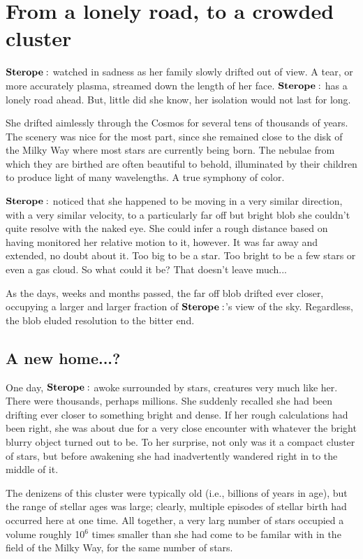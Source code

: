 \section{From a lonely road, to a crowded cluster}

$\Sterope$ watched in sadness as her family slowly drifted out of view.  A tear, or more accurately plasma, streamed down the length of her face.  $\Sterope$ has a lonely road ahead.  But, little did she know, her isolation would not last for long.

She drifted aimlessly through the Cosmos for several tens of thousands of years.  The scenery was nice for the most part, since she remained close to the disk of the Milky Way where most stars are currently being born.  The nebulae from which they are birthed are often beautiful to behold, illuminated by their children to produce light of many wavelengths.  A true symphony of color.  

$\Sterope$ noticed that she happened to be moving in a very similar direction, with a very similar velocity, to a particularly far off but bright blob she couldn't quite resolve with the naked eye.  She could infer a rough distance based on having monitored her relative motion to it, however.  It was far away and extended, no doubt about it.  Too big to be a star.  Too bright to be a few stars or even a gas cloud.  So what could it be?  That doesn't leave much...

As the days, weeks and months passed, the far off blob drifted ever closer, occupying a larger and larger fraction of $\Sterope$'s view of the sky.  Regardless, the blob eluded resolution to the bitter end.

\subsection{A new home...?}

One day, $\Sterope$ awoke surrounded by stars, creatures very much like her.  There were thousands, perhaps millions.  She suddenly recalled she had been drifting ever closer to something bright and dense.  If her rough calculations had been right, she was about due for a very close encounter with whatever the bright blurry object turned out to be.  To her surprise, not only was it a compact cluster of stars, but before awakening she had inadvertently wandered right in to the middle of it.

The denizens of this cluster were typically old (i.e., billions of years in age), but the range of stellar ages was large; clearly, multiple episodes of stellar birth had occurred here at one time.  All together, a very larg number of stars occupied a volume roughly 10$^6$ times smaller than she had come to be familar with in the field of the Milky Way, for the same number of stars.  

